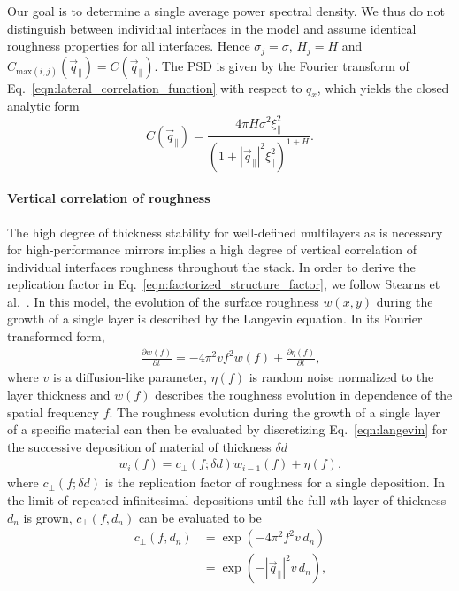 Our goal is to determine a single average power spectral density. We thus do not distinguish between individual interfaces in the model and assume identical roughness properties for all interfaces. Hence $\sigma_j = \sigma$, $H_j = H$ and $C_{\text{max}(i,j)}(\vec{q}_\parallel) = C(\vec{q}_\parallel)$. The PSD is given by the Fourier transform of Eq.~\eqref{eqn:lateral_correlation_function} with respect to $q_x$, which yields the closed analytic form
\begin{equation}
        C(\vec{q}_\parallel) = \frac{4 \pi H \sigma^2 \xi_\parallel^2}{(1+|\vec{q}_\parallel|^2\xi_\parallel^2)^{1+H}} \text{.} \label{eqn:psd} 
\end{equation}

\paragraph{Vertical correlation of roughness}
The high degree of thickness stability for well-defined multilayers as is necessary for high-performance mirrors implies a high degree of vertical correlation of individual interfaces roughness throughout the stack. In order to derive the replication factor in Eq.~\eqref{eqn:factorized_structure_factor}, we follow Stearns et al.~\cite{stearns_x-ray_1992}. In this model, the evolution of the surface roughness $w(x,y)$ during the growth of a single layer is described by the Langevin equation. In its Fourier transformed form, 
\begin{align}
\frac{\partial w(f)}{\partial t} = - 4 \pi^2 v f^2 w(f) + \frac{\partial \eta(f)}{\partial t} \text{,} \label{eqn:langevin}
\end{align}
where $v$ is a diffusion-like parameter, $\eta(f)$ is random noise normalized to the layer thickness and $w(f)$ describes the roughness evolution in dependence of the spatial frequency $f$. The roughness evolution during the growth of a single layer of a specific material can then be evaluated by discretizing Eq.~\eqref{eqn:langevin} for the successive deposition of material of thickness $\delta d$
\begin{align}
w_i(f) = c_\perp(f;\delta d) w_{i-1}(f) + \eta(f) \text{,}
\end{align}
where $c_\perp(f;\delta d)$ is the replication factor of roughness for a single deposition. In the limit of repeated infinitesimal depositions until the full $n$th layer of thickness $d_n$ is grown, $c_\perp(f,d_n)$ can be evaluated to be \cite{spiller_multilayer_1993}
\begin{align}
    c_\perp(f,d_n) &= \exp(-4\pi^2 f^2 v \,d_n) \nonumber \\
                   &= \exp(-|\vec{q}_\parallel|^2 v \,d_n)\text{,}
\end{align}
